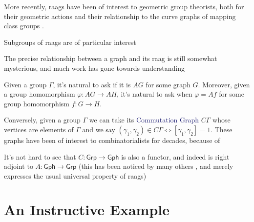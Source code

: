 \documentclass[12pt]{article}
\theoremstyle{definition}
\theoremstyle{theorem}
\newcommand*{\important}[1]{\textcolor{MidnightBlue}{#1}}
\begin{document}
    More recently, raags have been of interest to geometric group theorists,
    both for their geometric actions 
    and their relationship to the curve graphs of mapping class groups
    .


    Subgroups of raags are of particular interest 

    The precise relationship between a graph and its raag is still somewhat
    mysterious, and much work has gone towards understanding 

    Given a group $\Gamma$, it's natural to ask if it is $AG$ for some 
    graph $G$. Moreover, given a group homomorphism $\varphi : AG \to AH$, it's 
    natural to ask when $\varphi = Af$ for some group homomorphism $f : G \to H$.


    Conversely, given a group $\Gamma$ we can take its \important{Commutation Graph}
    $C\Gamma$ whose vertices are elements of $\Gamma$ and we say 
    $(\gamma_1, \gamma_2) \in C\Gamma \iff [\gamma_1, \gamma_2] = 1$.
    These graphs have been of interest to combinatorialists 
    for decades, because of 

    It's not hard to see that $C : \mathsf{Grp} \to \mathsf{Gph}$ is also a 
    functor, and indeed is right adjoint to $A : \mathsf{Gph} \to \mathsf{Grp}$
    (this has been noticed by many others , and merely 
    expresses the usual universal property of raags)


\section{An Instructive Example}

\end{document}

